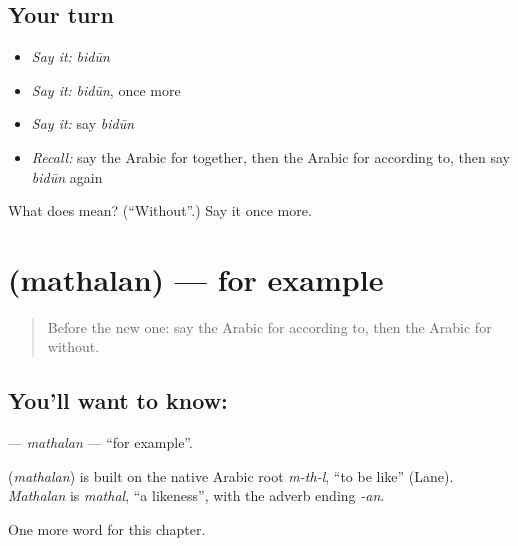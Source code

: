 \subsection*{Your turn}
\begin{itemize}
\raggedright
  \item \emph{Say it:} \emph{bidūn}
  \item \emph{Say it:} \emph{bidūn}, once more
  \item \emph{Say it:} say \emph{bidūn}
  \item \emph{Recall:} say the Arabic for together, then the Arabic for according to, then say \emph{bidūn} again
\end{itemize}

\begin{tcolorbox}[breakable,colback=teal!4,colframe=teal!35!black,title={Before you move on}]
What does  mean? (\textquotedblleft{}Without\textquotedblright{}.) Say it once more.
\end{tcolorbox}
\section[\texorpdfstring{\ar{مثلا} (mathalan)}{مثلا (mathalan)}]{ (mathalan) — for example}

\label{lesson:AR-C268-mathalan}



\begin{quote}
Before the new one: say the Arabic for according to, then the Arabic for without.
\end{quote}

\subsection*{You'll want to know: }
\textbf{} — \emph{mathalan} — \textquotedblleft{}for example\textquotedblright{}.

\begin{cousinweb}
\textbf{} (\emph{mathalan}) is built on the native Arabic root \emph{m-th-l}, \textquotedblleft{}to be like\textquotedblright{} (Lane). \emph{Mathalan} is \emph{mathal}, \textquotedblleft{}a likeness\textquotedblright{}, with the adverb ending \emph{-an}.
\end{cousinweb}

\begin{grammarlens}[title={What you've built}]
One more word for this chapter.
\end{grammarlens}

